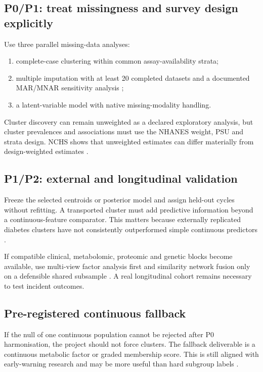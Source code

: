 \documentclass[11pt,a4paper]{article}
\begin{document}
\subsection{P0/P1: treat missingness and survey design explicitly}

Use three parallel missing-data analyses:

\begin{enumerate}
  \item complete-case clustering within common assay-availability strata;
  \item multiple imputation with at least 20 completed datasets and a documented
  MAR/MNAR sensitivity analysis \citep{sterne2009,vanbuuren2011};
  \item a latent-variable model with native missing-modality handling.
\end{enumerate}

Cluster discovery can remain unweighted as a declared exploratory analysis, but
cluster prevalences and associations must use the NHANES weight, PSU and strata
design. NCHS shows that unweighted estimates can differ materially from
design-weighted estimates \citep{nhanesWeights,nhanesVariance}.

\subsection{P1/P2: external and longitudinal validation}

Freeze the selected centroids or posterior model and assign held-out cycles
without refitting. A transported cluster must add predictive information beyond
a continuous-feature comparator. This matters because externally replicated
diabetes clusters have not consistently outperformed simple continuous
predictors \citep{ahlqvist2018,dennis2019}.

If compatible clinical, metabolomic, proteomic and genetic blocks become
available, use multi-view factor analysis first and similarity network fusion
only on a defensible shared subsample \citep{mofa2018,snf2014}. A real
longitudinal cohort remains necessary to test incident outcomes.

\subsection{Pre-registered continuous fallback}

If the null of one continuous population cannot be rejected after P0
harmonisation, the project should not force clusters. The fallback deliverable is
a continuous metabolic factor or graded membership score. This is still aligned
with early-warning research and may be more useful than hard subgroup labels
\citep{dalmaijer2022,dennis2019}.
\end{document}
